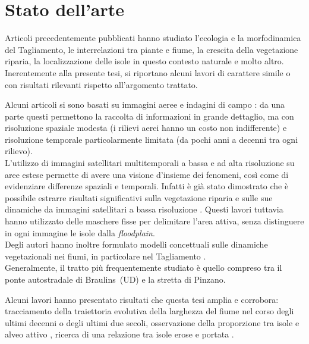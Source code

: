 \section{Stato dell'arte}
Articoli precedentemente pubblicati hanno studiato l'ecologia e la morfodinamica del Tagliamento, le interrelazioni tra piante e fiume, la crescita della vegetazione riparia, la localizzazione delle isole in questo contesto naturale e molto altro.
\\
Inerentemente alla presente tesi, si riportano alcuni lavori di carattere simile o con risultati rilevanti rispetto all'argomento trattato.

Alcuni articoli si sono basati su immagini aeree e indagini di campo : da una parte questi permettono la raccolta di informazioni in grande dettaglio, ma con risoluzione spaziale modesta (i rilievi aerei hanno un costo non indifferente) e risoluzione temporale particolarmente limitata (da pochi anni a decenni tra ogni rilievo).
\\
L'utilizzo di immagini satellitari multitemporali a bassa e ad alta risoluzione su aree estese permette di avere una visione d'insieme dei fenomeni, così come di evidenziare differenze spaziali e temporali.
Infatti è già stato dimostrato che è possibile estrarre risultati significativi sulla vegetazione riparia e sulle sue dinamiche da immagini satellitari a bassa risoluzione .
Questi lavori tuttavia hanno utilizzato delle maschere fisse per delimitare l'area attiva, senza distinguere in ogni immagine le isole dalla \emph{floodplain}.
\\
Degli autori hanno inoltre formulato modelli concettuali sulle dinamiche vegetazionali nei fiumi, in particolare nel Tagliamento .
\\
Generalmente, il tratto più frequentemente studiato è quello compreso tra il ponte autostradale di Braulins~(UD) e la stretta di Pinzano.

Alcuni lavori hanno presentato risultati che questa tesi amplia e corrobora: tracciamento della traiettoria evolutiva della larghezza del fiume nel corso degli ultimi decenni o degli ultimi due secoli, osservazione della proporzione tra isole e alveo attivo , ricerca di una relazione tra isole erose e portata .

